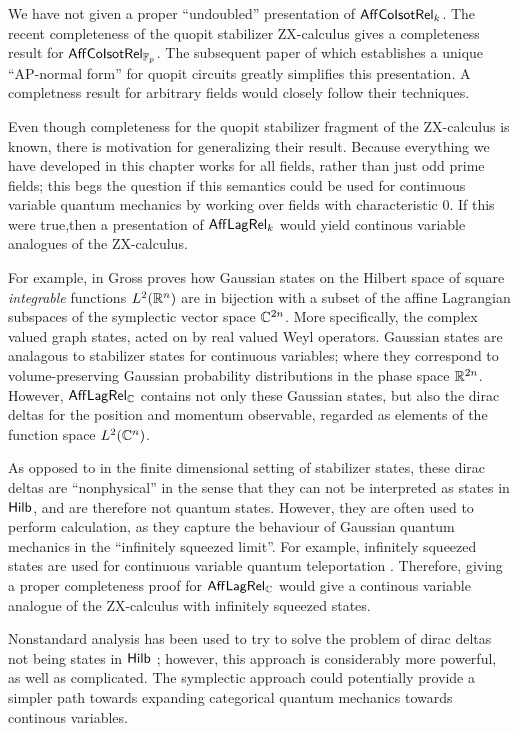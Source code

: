  

We have not given a proper ``undoubled''  presentation of $\mathsf{Aff}{\sf Co}{\sf Isot}\mathsf{Rel}_k$.  The recent completeness of the quopit stabilizer ZX-calculus \cite{booth} gives a completeness result for $\mathsf{Aff}{\sf Co}{\sf Isot}\mathsf{Rel}_{\mathbb{F}_p}$. The subsequent paper of \cite{poor} which establishes a unique ``AP-normal form'' for quopit circuits greatly simplifies this presentation.  A completness result for arbitrary fields would closely follow their techniques.

Even though completeness for the quopit stabilizer fragment of the ZX-calculus is known, there is motivation for generalizing their result.
Because everything we have developed in this chapter works for all fields, rather than just odd prime fields; this begs the question if this semantics could be used for continuous variable quantum mechanics by working over fields with characteristic 0.  If this were true,then a presentation of $\mathsf{Aff}\mathsf{Lag}\mathsf{Rel}_k$ would yield continous variable analogues of the ZX-calculus.

 For example, in \cite[Theorem 2]{gross} Gross proves how  Gaussian states on the Hilbert space of square {\em integrable} functions $L^2(\mathbb{R}^n)$ are in bijection with a subset of the  affine Lagrangian subspaces of the symplectic vector space $\mathbb{C}^{2n}$.  More specifically, the  complex valued graph states, acted on by real valued Weyl operators. 
Gaussian states are analagous to stabilizer states for continuous variables; where they correspond to volume-preserving Gaussian probability distributions in the phase space $\mathbb{R}^{2n}$.
However,  $\mathsf{Aff}\mathsf{Lag}\mathsf{Rel}_{\mathbb{C}}$ contains not only these Gaussian states, but also the dirac deltas for the position and momentum observable, regarded as elements of the function space  $L^2(\mathbb{C}^n)$.

As opposed to in the finite dimensional setting of stabilizer states,   these   dirac deltas are ``nonphysical'' in the sense that they can not be interpreted as states in $\mathsf{Hilb}$, and are therefore not quantum states.  However, they are often used  to perform calculation, as they capture the behaviour of Gaussian quantum mechanics in the ``infinitely squeezed limit''.  For example, infinitely squeezed states are used for continuous variable quantum teleportation \cite{Milburn1999}. Therefore, giving a proper completeness proof for $\mathsf{Aff}\mathsf{Lag}\mathsf{Rel}_{\mathbb{C}}$ would give a continous variable analogue of the ZX-calculus with infinitely squeezed states.

Nonstandard analysis has been used to try to solve the problem of dirac deltas not being states in $\mathsf{Hilb}$  \cite{Gogioso2017}; however, this approach is considerably more powerful, as well as complicated.  The symplectic approach could potentially provide a simpler path towards expanding categorical quantum mechanics towards continous variables.

